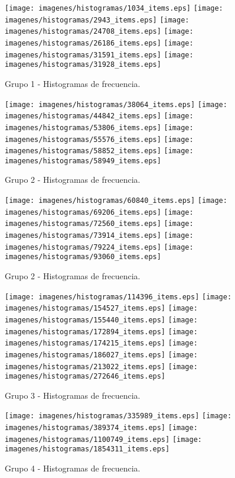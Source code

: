 \begin{figure}[h!]
\centering
{\texttt{[image: imagenes/histogramas/1034\_items.eps]}}
{\texttt{[image: imagenes/histogramas/2943\_items.eps]}}
{\texttt{[image: imagenes/histogramas/24708\_items.eps]}}
{\texttt{[image: imagenes/histogramas/26186\_items.eps]}}
{\texttt{[image: imagenes/histogramas/31591\_items.eps]}}
{\texttt{[image: imagenes/histogramas/31928\_items.eps]}}
\caption{\small Grupo 1 - Histogramas de frecuencia.}
\end{figure}
\begin{figure}[h!]
\centering
{\texttt{[image: imagenes/histogramas/38064\_items.eps]}}
{\texttt{[image: imagenes/histogramas/44842\_items.eps]}}
{\texttt{[image: imagenes/histogramas/53806\_items.eps]}}
{\texttt{[image: imagenes/histogramas/55576\_items.eps]}}
{\texttt{[image: imagenes/histogramas/58852\_items.eps]}}
{\texttt{[image: imagenes/histogramas/58949\_items.eps]}}
\caption{\small Grupo 2 - Histogramas de frecuencia.}
\end{figure}
\begin{figure}[h!]
\centering
{\texttt{[image: imagenes/histogramas/60840\_items.eps]}}
{\texttt{[image: imagenes/histogramas/69206\_items.eps]}}
{\texttt{[image: imagenes/histogramas/72560\_items.eps]}}
{\texttt{[image: imagenes/histogramas/73914\_items.eps]}}
{\texttt{[image: imagenes/histogramas/79224\_items.eps]}}
{\texttt{[image: imagenes/histogramas/93060\_items.eps]}}
\caption{\small Grupo 2 - Histogramas de frecuencia.}
\end{figure}
\begin{figure}[h!]
\centering
{\texttt{[image: imagenes/histogramas/114396\_items.eps]}}
{\texttt{[image: imagenes/histogramas/154527\_items.eps]}}
{\texttt{[image: imagenes/histogramas/155440\_items.eps]}}
{\texttt{[image: imagenes/histogramas/172894\_items.eps]}}
{\texttt{[image: imagenes/histogramas/174215\_items.eps]}}
{\texttt{[image: imagenes/histogramas/186027\_items.eps]}}
{\texttt{[image: imagenes/histogramas/213022\_items.eps]}}
{\texttt{[image: imagenes/histogramas/272646\_items.eps]}}
\caption{\small Grupo 3 - Histogramas de frecuencia.}
\end{figure}
\begin{figure}[h!]
\centering
{\texttt{[image: imagenes/histogramas/335989\_items.eps]}}
{\texttt{[image: imagenes/histogramas/389374\_items.eps]}}
{\texttt{[image: imagenes/histogramas/1100749\_items.eps]}}
{\texttt{[image: imagenes/histogramas/1854311\_items.eps]}}
\caption{\small Grupo 4 - Histogramas de frecuencia.}
\end{figure}
